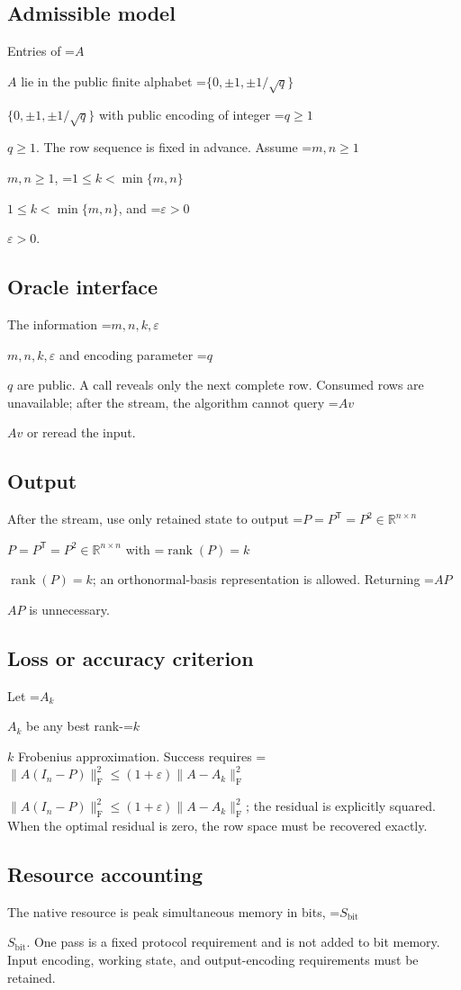 \documentclass[10pt,a4paper]{article}
\newcommand{\AtlasMath}[1]{\par\begingroup\centering\setbox0=\hbox{$\displaystyle #1$}\ifdim\wd0>1.4\linewidth\typeout{ATLAS WIDE FORMULA: \the\wd0}\fi\ifdim\wd0>\linewidth\resizebox{\linewidth}{!}{\box0}\else\box0\fi\par\endgroup}
\newcommand{\AtlasInlineMath}[1]{\begingroup\setbox0=\hbox{$#1$}\ifdim\wd0>.4\linewidth\endgroup\AtlasMath{#1}\else\endgroup$#1$\fi}
\begin{document}
\subsection{Admissible model}
Entries of \AtlasInlineMath{A} lie in the public finite alphabet \AtlasInlineMath{\{0,\pm1,\pm1/\sqrt q\}} with public encoding of integer \AtlasInlineMath{q\ge1}. The row sequence is fixed in advance. Assume \AtlasInlineMath{m,n\ge1}, \AtlasInlineMath{1\le k<\min\{m,n\}}, and \AtlasInlineMath{\varepsilon>0}.

\subsection{Oracle interface}
The information \AtlasInlineMath{m,n,k,\varepsilon} and encoding parameter \AtlasInlineMath{q} are public. A call reveals only the next complete row. Consumed rows are unavailable; after the stream, the algorithm cannot query \AtlasInlineMath{Av} or reread the input.

\subsection{Output}
After the stream, use only retained state to output \AtlasInlineMath{P=P^{\mathsf T}=P^2\in\mathbb{R}^{n\times n}} with \AtlasInlineMath{\operatorname{rank}(P)=k}; an orthonormal-basis representation is allowed. Returning \AtlasInlineMath{AP} is unnecessary.

\subsection{Loss or accuracy criterion}
Let \AtlasInlineMath{A_k} be any best rank-\AtlasInlineMath{k} Frobenius approximation. Success requires \AtlasInlineMath{\|A(I_n-P)\|_{\mathrm{F}}^2\le(1+\varepsilon)\|A-A_k\|_{\mathrm{F}}^2}; the residual is explicitly squared. When the optimal residual is zero, the row space must be recovered exactly.

\subsection{Resource accounting}
The native resource is peak simultaneous memory in bits, \AtlasInlineMath{S_{\mathrm{bit}}}. One pass is a fixed protocol requirement and is not added to bit memory. Input encoding, working state, and output-encoding requirements must be retained.
\end{document}
